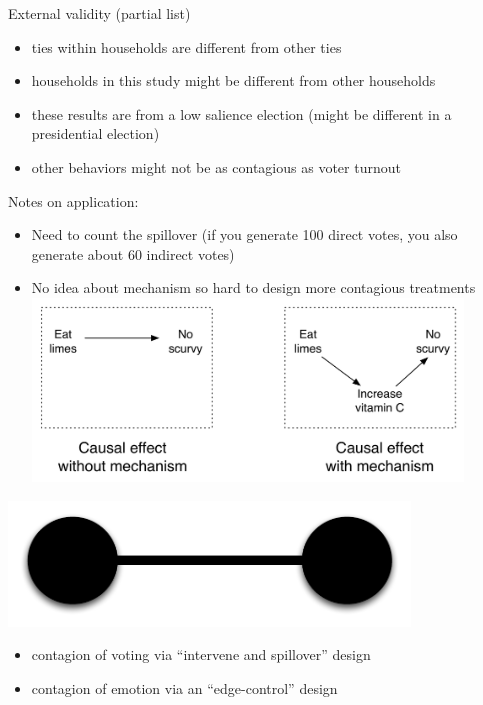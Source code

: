 \documentclass[aspectratio=169]{beamer}
\begin{document}
\begin{frame}

External validity (partial list)
\begin{itemize}
\item ties within households are different from other ties \pause
\item households in this study might be different from other households \pause
\item these results are from a low salience election (might be different in a presidential election) \pause
\item other behaviors might not be as contagious as voter turnout
\end{itemize}

\end{frame}
\begin{frame}

Notes on application:
\pause
\begin{itemize}
\item Need to count the spillover (if you generate 100 direct votes, you also generate about 60 indirect votes)
\pause
\item No idea about mechanism so hard to design more contagious treatments
\includegraphics[width=0.9\textwidth]{figures/bitbybit4-10_mechanism_schematic}
\end{itemize}

\end{frame}
\begin{frame}

\begin{center}
\includegraphics[width=0.8\textwidth]{figures/dyad}
\end{center}

\begin{itemize}
\item contagion of voting via ``intervene and spillover'' design \pause
\item contagion of emotion via an ``edge-control'' design
\end{itemize}

\end{frame}
\end{document}
